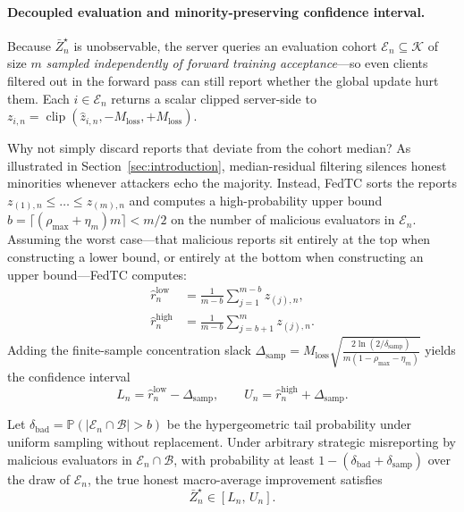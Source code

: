 \paragraph{Decoupled evaluation and minority-preserving confidence interval.}
Because $\bar{Z}_n^\star$ is unobservable, the server queries an evaluation cohort $\mathcal{E}_n \subseteq \mathcal{K}$ of size $m$ \emph{sampled independently of forward training acceptance}---so even clients filtered out in the forward pass can still report whether the global update hurt them. Each $i \in \mathcal{E}_n$ returns a scalar clipped server-side to $z_{i,n} = \operatorname{clip}(\hat{z}_{i,n}, -M_{\mathrm{loss}}, +M_{\mathrm{loss}})$.

Why not simply discard reports that deviate from the cohort median? As illustrated in Section~\ref{sec:introduction}, median-residual filtering silences honest minorities whenever attackers echo the majority. Instead, FedTC sorts the reports $z_{(1),n} \le \dots \le z_{(m),n}$ and computes a high-probability upper bound $b = \lceil(\rho_{\max} + \eta_m)m\rceil < m/2$ on the number of malicious evaluators in $\mathcal{E}_n$. Assuming the worst case---that malicious reports sit entirely at the top when constructing a lower bound, or entirely at the bottom when constructing an upper bound---FedTC computes:
\begin{equation}
    \begin{aligned}
        \hat{r}_n^{\mathrm{low}} &= \frac{1}{m-b}\sum_{j=1}^{m-b} z_{(j),n}, \\
        \hat{r}_n^{\mathrm{high}} &= \frac{1}{m-b}\sum_{j=b+1}^{m} z_{(j),n}.
    \end{aligned}
    \label{eq:trimmed_bounds}
\end{equation}
Adding the finite-sample concentration slack $\Delta_{\mathrm{samp}} = M_{\mathrm{loss}}\sqrt{\frac{2\ln(2/\delta_{\mathrm{samp}})}{m(1-\rho_{\max}-\eta_m)}}$ yields the confidence interval
\begin{equation}
    L_n = \hat{r}_n^{\mathrm{low}} - \Delta_{\mathrm{samp}},
    \qquad
    U_n = \hat{r}_n^{\mathrm{high}} + \Delta_{\mathrm{samp}}.
    \label{eq:ci_interval}
\end{equation}

\begin{theorem}
\label{thm:ci_containment}
Let $\delta_{\mathrm{bad}} = \mathbb{P}(|\mathcal{E}_n \cap \mathcal{B}| > b)$ be the hypergeometric tail probability under uniform sampling without replacement. Under arbitrary strategic misreporting by malicious evaluators in $\mathcal{E}_n \cap \mathcal{B}$, with probability at least $1 - (\delta_{\mathrm{bad}} + \delta_{\mathrm{samp}})$ over the draw of $\mathcal{E}_n$, the true honest macro-average improvement satisfies
\begin{equation}
    \bar{Z}_n^\star \in [L_n,\, U_n].
\end{equation}
\end{theorem}


